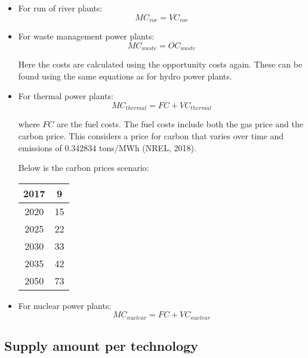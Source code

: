 \begin{itemize}
\item For run of river plants:
\begin{equation}
MC_{ror} = VC_{ror}
\end{equation}

\item For waste management power plants:
\begin{equation}
MC_{waste} = OC_{waste}
\end{equation}

Here the costs are calculated using the opportunity costs again. These can be found using the same equations as for hydro power plants.

\item For thermal power plants:
\begin{equation}
MC_{thermal} = FC + VC_{thermal}
\end{equation}

where $FC$ are the fuel costs. The fuel costs include both the gas price and the carbon price. This considers a price for carbon that varies over time and emissions of 0.342834 tons/MWh (NREL, 2018).

Below is the carbon prices scenario:

\begin{center}
\begin{tabular}{ |c|c| } 
\hline
2017		& 9 \\ \hline
2020		& 15  \\ \hline
2025		& 22  \\ \hline
2030		& 33  \\ \hline
2035		& 42 \\ \hline
2050		& 73 \\
 \hline
\end{tabular}
\end{center}


\item For nuclear power plants:
\begin{equation}
MC_{nuclear} = FC + VC_{nuclear}
\end{equation}

\end{itemize}

\subsection{Supply amount per technology}

